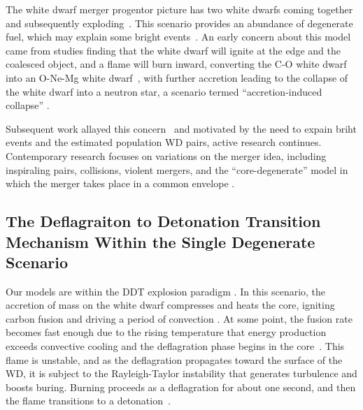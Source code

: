 \documentclass[iop,apj]{emulateapj}
\begin{document}
The white dwarf merger progentor picture has two white dwarfs coming 
together and subsequently exploding~\citep{tutukovyungelson76,tutukovyungelson79,
webbink84,ibentutukov84}. This scenario provides an abundance of degenerate fuel, 
which may explain some bright events~\citep{scalzo:2010,Yuan:2010}. 
An early concern about this model came from studies finding that
the white dwarf will ignite at the edge and the coalesced object, 
and a flame will burn inward, converting the C-O white dwarf into 
an O-Ne-Mg white dwarf~\citep{saionomoto1985,saionomoto2004}, with
further accretion leading to the collapse of the white dwarf
into a neutron star, a scenario termed ``accretion-induced collapse''
\citep{nomotokondo1991}.

Subsequent work allayed this concern~\citep{yoonetal2007,lorenaguilaretal2009,
Shenetal12, pakmoretal2012b} and motivated by the need to expain briht events
and the estimated population WD pairs, active research continues. Contemporary
research focuses on variations on the merger idea, including 
inspiraling pairs, collisions, violent mergers,
and the ``core-degenerate'' model in which the merger takes place in
a common envelope \citep{raskinetal2009,pakmoretal2011,kashi:2011,pakmoretal2012a,Shenetal12,katzetal2016}.


\subsection{The Deflagraiton to Detonation Transition Mechanism Within the Single Degenerate Scenario}

Our models are within the DDT explosion paradigm \cite{1986SvAL,
Khokhlov1991Delayed-detonat,NiemWoos97,Niem99,belletal2004,fishjump2015}. 
In this scenario, the accretion of mass on the white dwarf compresses and 
heats the core, igniting carbon fusion and driving a period of convection
\citep{WoosWunsKuhl04,wunschwoosley2004,Kuhletal06,nonakaetal2012}.
At some point, the fusion rate becomes fast enough due to the rising
temperature that energy production exceeds convective cooling and
the deflagration phase begins in the core~\citep{Nomo84,WoosWunsKuhl04}.
This flame is unstable, and as the deflagration propagates toward the surface
of the WD, it is subject to the Rayleigh-Taylor instability that generates
turbulence and boosts buring.  
Burning proceeds as a deflagration for about one second, and then 
the flame transitions to a detonation~\citep{hoflich.khokhlov.ea:delayed}. 


\end{document}
